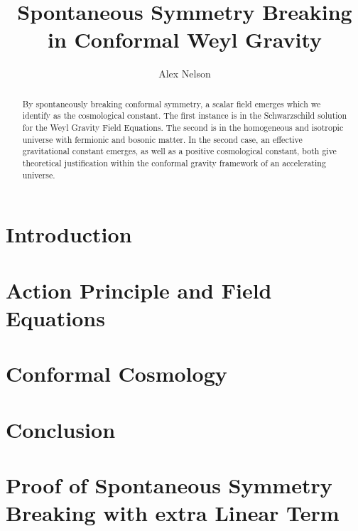 \documentclass{amsart}
\title{Spontaneous Symmetry Breaking in Conformal Weyl Gravity}
\author{Alex Nelson}
\numberwithin{equation}{section}
\begin{document}
\maketitle
\begin{abstract}
By spontaneously breaking conformal symmetry, a scalar field emerges
which we identify as the cosmological constant. The first instance is
in the Schwarzschild solution for the Weyl Gravity Field
Equations. The second is in the homogeneous and isotropic universe
with fermionic and bosonic matter. In the second case, an effective
gravitational constant emerges, as well as a positive cosmological
constant, both give theoretical justification within the conformal
gravity framework of an accelerating universe.
\end{abstract} 

\section{Introduction}

\section{Action Principle and Field Equations}

\section{Conformal Cosmology}

\section{Conclusion}

\appendix

%
\section{Proof of Spontaneous Symmetry Breaking with extra Linear
  Term}



\end{document}
